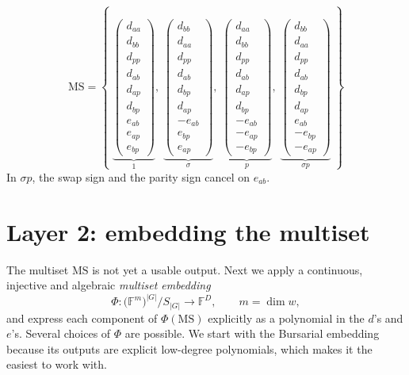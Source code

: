 \documentclass[11pt]{article}
\theoremstyle{definition}
\theoremstyle{remark}
\newcommand{\F}{\mathbb{F}}
\newcommand{\MS}{\mathrm{MS}}
\begin{document}
\[
  \MS = \left\{\;
  \underbrace{\begin{pmatrix}
    d_{aa}\\ d_{bb}\\ d_{pp}\\ d_{ab}\\ d_{ap}\\ d_{bp}\\ e_{ab}\\ e_{ap}\\ e_{bp}
  \end{pmatrix}}_{1},\;
  \underbrace{\begin{pmatrix}
    d_{bb}\\ d_{aa}\\ d_{pp}\\ d_{ab}\\ d_{bp}\\ d_{ap}\\ -e_{ab}\\ e_{bp}\\ e_{ap}
  \end{pmatrix}}_{\sigma},\;
  \underbrace{\begin{pmatrix}
    d_{aa}\\ d_{bb}\\ d_{pp}\\ d_{ab}\\ d_{ap}\\ d_{bp}\\ -e_{ab}\\ -e_{ap}\\ -e_{bp}
  \end{pmatrix}}_{p},\;
  \underbrace{\begin{pmatrix}
    d_{bb}\\ d_{aa}\\ d_{pp}\\ d_{ab}\\ d_{bp}\\ d_{ap}\\ e_{ab}\\ -e_{bp}\\ -e_{ap}
  \end{pmatrix}}_{\sigma p}
  \;\right\}
\]
In $\sigma p$, the swap sign and the parity sign cancel on $e_{ab}$.

\section{Layer 2: embedding the multiset}

The multiset $\MS$ is not yet a usable output. Next we apply a
continuous, injective and algebraic \emph{multiset embedding}
\[
  \Phi : \bigl(\F^m\bigr)^{|G|} / S_{|G|} \longrightarrow \F^D, \qquad m = \dim w,
\]
and express each component of $\Phi(\MS)$ explicitly as a polynomial in
the $d$'s and $e$'s. Several choices of $\Phi$ are possible. We start with the
Bursarial embedding because its outputs are explicit low-degree polynomials,
which makes it the easiest to work with.
\end{document}
